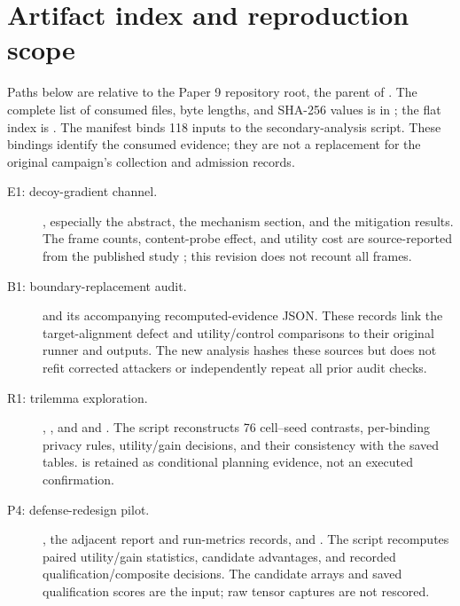 \section{Artifact index and reproduction scope}
\label{app:artifacts}

Paths below are relative to the Paper 9 repository root, the parent of
. The complete list of consumed files, byte lengths,
and SHA-256 values is in ;
the flat index is . The manifest
binds 118 inputs to the secondary-analysis script. These bindings identify
the consumed evidence; they are not a replacement for the original
campaign's collection and admission records.

\begin{description}
\item[\hypertarget{artifact-E1}{E1: decoy-gradient channel.}]
, especially the abstract,
the mechanism section, and the mitigation results. The frame counts,
content-probe effect, and utility cost are source-reported from the
published study \citep{paper1}; this revision does not recount all frames.

\item[\hypertarget{artifact-B1}{B1: boundary-replacement audit.}]
and its accompanying recomputed-evidence JSON. These records link the
target-alignment defect and utility/control comparisons to their original
runner and outputs. The new analysis hashes these sources but does not
refit corrected attackers or independently repeat all prior audit checks.

\item[\hypertarget{artifact-R1}{R1: trilemma exploration.}]
,
, and
 and
.
The script reconstructs 76 cell--seed contrasts, per-binding privacy rules,
utility/gain decisions, and their consistency with the saved tables.
is retained as conditional planning evidence, not an executed confirmation.

\item[\hypertarget{artifact-P4}{P4: defense-redesign pilot.}]
,
the adjacent report and run-metrics records, and
.
The script recomputes paired utility/gain statistics, candidate advantages,
and recorded qualification/composite decisions. The candidate arrays and
saved qualification scores are the input; raw tensor captures are not
rescored.


\end{description}
